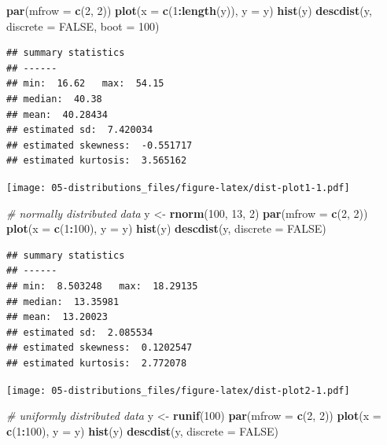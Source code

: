 \documentclass[english,10pt,a4paper,oneside]{book}
\newenvironment{Shaded}{\begin{snugshade}}{\end{snugshade}}
\newcommand{\CommentTok}[1]{\textcolor[rgb]{0.56,0.35,0.01}{\textit{#1}}}
\newcommand{\DataTypeTok}[1]{\textcolor[rgb]{0.13,0.29,0.53}{#1}}
\newcommand{\DecValTok}[1]{\textcolor[rgb]{0.00,0.00,0.81}{#1}}
\newcommand{\KeywordTok}[1]{\textcolor[rgb]{0.13,0.29,0.53}{\textbf{#1}}}
\newcommand{\NormalTok}[1]{#1}
\newcommand{\OperatorTok}[1]{\textcolor[rgb]{0.81,0.36,0.00}{\textbf{#1}}}
\newcommand{\OtherTok}[1]{\textcolor[rgb]{0.56,0.35,0.01}{#1}}
\newcommand{\StringTok}[1]{\textcolor[rgb]{0.31,0.60,0.02}{#1}}
\theoremstyle{definition}
\theoremstyle{definition}
\theoremstyle{definition}
\theoremstyle{remark}
\begin{document}
\begin{Shaded}
\begin{Highlighting}[]
\KeywordTok{par}\NormalTok{(}\DataTypeTok{mfrow =} \KeywordTok{c}\NormalTok{(}\DecValTok{2}\NormalTok{, }\DecValTok{2}\NormalTok{))}
\KeywordTok{plot}\NormalTok{(}\DataTypeTok{x =} \KeywordTok{c}\NormalTok{(}\DecValTok{1}\OperatorTok{:}\KeywordTok{length}\NormalTok{(y)), }\DataTypeTok{y =}\NormalTok{ y)}
\KeywordTok{hist}\NormalTok{(y)}
\KeywordTok{descdist}\NormalTok{(y, }\DataTypeTok{discrete =} \OtherTok{FALSE}\NormalTok{, }\DataTypeTok{boot =} \DecValTok{100}\NormalTok{)}
\end{Highlighting}
\end{Shaded}

\begin{verbatim}
## summary statistics
## ------
## min:  16.62   max:  54.15 
## median:  40.38 
## mean:  40.28434 
## estimated sd:  7.420034 
## estimated skewness:  -0.551717 
## estimated kurtosis:  3.565162
\end{verbatim}

\texttt{[image: 05-distributions\_files/figure-latex/dist-plot1-1.pdf]}

\begin{Shaded}
\begin{Highlighting}[]
\CommentTok{# normally distributed data}
\NormalTok{y <-}\StringTok{ }\KeywordTok{rnorm}\NormalTok{(}\DecValTok{100}\NormalTok{, }\DecValTok{13}\NormalTok{, }\DecValTok{2}\NormalTok{)}
\KeywordTok{par}\NormalTok{(}\DataTypeTok{mfrow =} \KeywordTok{c}\NormalTok{(}\DecValTok{2}\NormalTok{, }\DecValTok{2}\NormalTok{))}
\KeywordTok{plot}\NormalTok{(}\DataTypeTok{x =} \KeywordTok{c}\NormalTok{(}\DecValTok{1}\OperatorTok{:}\DecValTok{100}\NormalTok{), }\DataTypeTok{y =}\NormalTok{ y)}
\KeywordTok{hist}\NormalTok{(y)}
\KeywordTok{descdist}\NormalTok{(y, }\DataTypeTok{discrete =} \OtherTok{FALSE}\NormalTok{)}
\end{Highlighting}
\end{Shaded}

\begin{verbatim}
## summary statistics
## ------
## min:  8.503248   max:  18.29135 
## median:  13.35981 
## mean:  13.20023 
## estimated sd:  2.085534 
## estimated skewness:  0.1202547 
## estimated kurtosis:  2.772078
\end{verbatim}

\texttt{[image: 05-distributions\_files/figure-latex/dist-plot2-1.pdf]}

\begin{Shaded}
\begin{Highlighting}[]
\CommentTok{# uniformly distributed data}
\NormalTok{y <-}\StringTok{ }\KeywordTok{runif}\NormalTok{(}\DecValTok{100}\NormalTok{)}
\KeywordTok{par}\NormalTok{(}\DataTypeTok{mfrow =} \KeywordTok{c}\NormalTok{(}\DecValTok{2}\NormalTok{, }\DecValTok{2}\NormalTok{))}
\KeywordTok{plot}\NormalTok{(}\DataTypeTok{x =} \KeywordTok{c}\NormalTok{(}\DecValTok{1}\OperatorTok{:}\DecValTok{100}\NormalTok{), }\DataTypeTok{y =}\NormalTok{ y)}
\KeywordTok{hist}\NormalTok{(y)}
\KeywordTok{descdist}\NormalTok{(y, }\DataTypeTok{discrete =} \OtherTok{FALSE}\NormalTok{)}
\end{Highlighting}
\end{Shaded}
\end{document}

